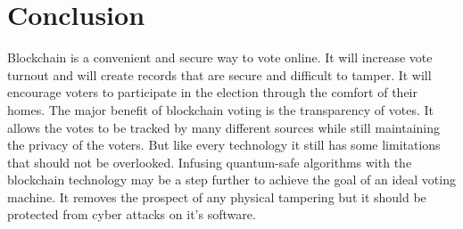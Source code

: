 \documentclass{article}
\begin{document}
\section{Conclusion}
 Blockchain is a convenient and secure way to vote online. It will increase vote turnout and will create records that are secure and difficult to tamper. It will encourage voters to participate in the election through the comfort of their homes. The major benefit of blockchain voting is the transparency of votes. It allows the votes to be tracked by many different sources while still maintaining the privacy of the voters. But like every technology it still has some limitations that should not be overlooked. Infusing quantum-safe algorithms with the blockchain technology may be a step further to achieve the goal of an ideal voting machine. It removes the prospect of any physical tampering but it should be protected from cyber attacks on it's software.






\appendix
\end{document}
